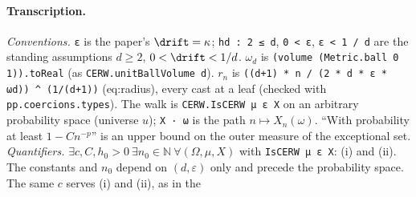 \paragraph{Transcription.}
\emph{Conventions.} \verb!ε! is the paper's $\drift=\kappa$; \verb!hd : 2 ≤ d!, \verb!0 < ε!, \verb!ε < 1 / d! are the standing assumptions $d\ge2$, $0<\drift<1/d$. $\omega_d$ is \verb!(volume (Metric.ball 0 1)).toReal! (as \verb!CERW.unitBallVolume d!). $r_n$ is \verb!((d+1) * n / (2 * d * ε * ωd)) ^ (1/(d+1))! (eq:radius), every cast at a leaf (checked with \verb!pp.coercions.types!). The walk is \verb!CERW.IsCERW μ ε X! on an arbitrary probability space (universe $u$); \verb!X · ω! is the path $n\mapsto X_n(\omega)$. ``With probability at least $1-Cn^{-p}$'' is an upper bound on the outer measure of the exceptional set. \emph{Quantifiers.} $\exists c,C,h_0>0\ \exists n_0\in\mathbb N\ \forall(\Omega,\mu,X)$ with \verb!IsCERW μ ε X!: (i) and (ii). The constants and $n_0$ depend on $(d,\varepsilon)$ only and precede the probability space. The same $c$ serves (i) and (ii), as in the
